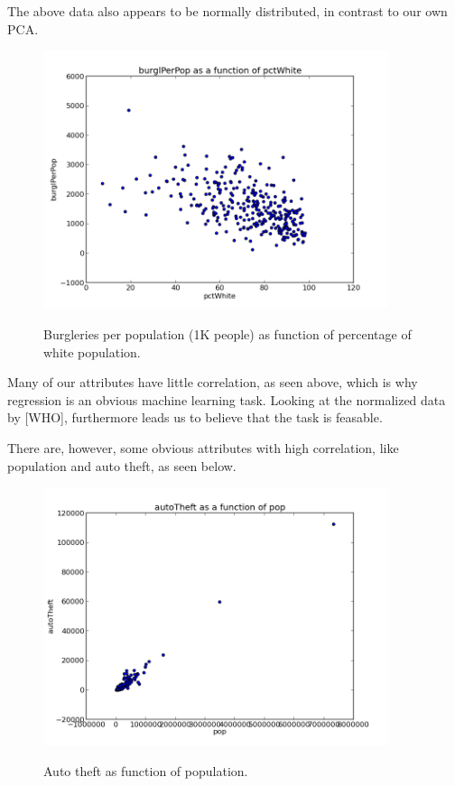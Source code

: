 The above data also appears to be normally distributed, in contrast to our own PCA.

\begin{figure}[H]
\centering
\includegraphics[width=0.9\textwidth]{correlations/burglPerPop-as-func-of-pctWhite.png}
\label{fig:prenorm_attrrem_0out}
\caption{Burgleries per population (1K people) as function of percentage of white population.}
\end{figure}

Many of our attributes have little correlation, as seen above, which is why regression is an obvious machine learning task. Looking at the normalized data by [WHO], furthermore leads us to believe that the task is feasable.

There are, however, some obvious attributes with high correlation, like population and auto theft, as seen below.

\begin{figure}[H]
\centering
\includegraphics[width=0.9\textwidth]{correlations/autoTheft-as-func-of-pop}
\label{fig:prenorm_attrrem_0out}
\caption{Auto theft as function of population.}
\end{figure}
